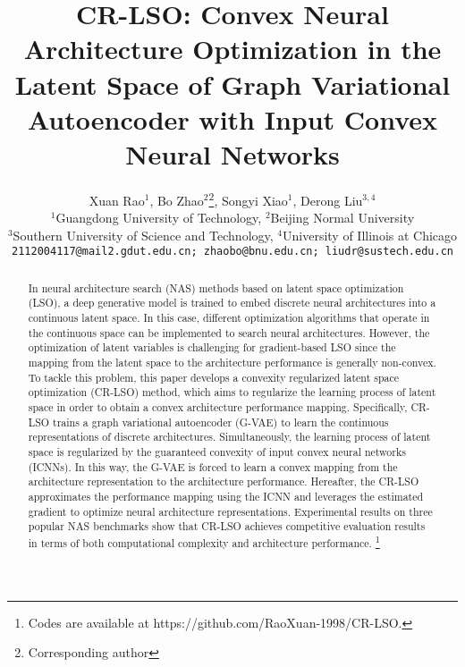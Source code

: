 \documentclass[10pt,twocolumn,letterpaper]{article}
\begin{document}
\title{CR-LSO: Convex Neural Architecture Optimization in the Latent Space of Graph Variational Autoencoder with Input Convex Neural Networks}

\author{Xuan Rao$^{1}$, Bo Zhao$^{2}$\footnote{Corresponding author}, Songyi Xiao$^{1}$, Derong Liu$^{3,4}$\\
$^{1}$Guangdong University of Technology, $^{2}$Beijing Normal University \\ $^{3}$Southern University of Science and Technology, $^{4}$University of Illinois at Chicago\\
{\tt\small 2112004117@mail2.gdut.edu.cn;  zhaobo@bnu.edu.cn;  liudr@sustech.edu.cn}
}
\maketitle

\begin{abstract}
In neural architecture search (NAS) methods based on latent space optimization (LSO), a deep generative model is trained to embed discrete neural architectures into a continuous latent space. In this case, different optimization algorithms that operate in the continuous space can be implemented to search neural architectures. However, the optimization of latent variables is challenging for gradient-based LSO since the mapping from the latent space to the architecture performance is generally non-convex. To tackle this problem, this paper develops a convexity regularized latent space optimization (CR-LSO) method, which aims to regularize the learning process of latent space in order to obtain a convex architecture performance mapping. Specifically, CR-LSO trains a graph variational autoencoder (G-VAE) to learn the continuous representations of discrete architectures. Simultaneously, the learning process of latent space is regularized by the guaranteed convexity of input convex neural networks (ICNNs). In this way, the G-VAE is forced to learn a convex mapping from the architecture representation to the architecture performance. Hereafter, the CR-LSO approximates the performance mapping using the ICNN and leverages the estimated gradient to optimize neural architecture representations. Experimental results on three popular NAS benchmarks show that CR-LSO achieves competitive evaluation results in terms of both computational complexity and architecture performance. \footnote{Codes are available at https://github.com/RaoXuan-1998/CR-LSO.}
\end{abstract}
\end{document}
